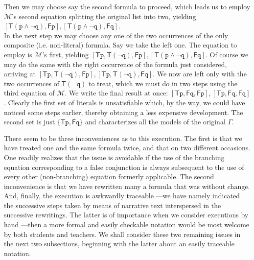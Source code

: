 \documentclass[a4paper,UKenglish]{lipics}
\newcounter{c}
\newcommand{\lett}[1]{\texttt{#1}}
\newcommand{\sg}[1]{\textsf{#1}}
\newcommand{\allmodels}{\ensuremath{\mathcal{M}}}
\begin{document}
\noindent Then we may choose say the second formula to proceed, which leads us to employ \allmodels's second equation splitting the original list into two, yielding
$[\sg{T}(\lett{p}\wedge\neg\lett{q}) , \sg{F}\lett{p}] , [\sg{T}(\lett{p}\wedge\neg\lett{q}) , \sg{F}\lett{q}]$.\\
In the next step we may choose any one of the two occurrences of the only composite (i.e. non-literal) formula. Say  we take the left one. The equation to employ is \allmodels's first, yielding
$[\sg{T}\lett{p} , \sg{T}(\neg\lett{q}) , \sg{F}\lett{p}] , [\sg{T}(\lett{p}\wedge\neg\lett{q}) , \sg{F}\lett{q}]$.
Of course we may do the same with the right occurrence of the formula just considered, arriving at
$[\sg{T}\lett{p} , \sg{T}(\neg\lett{q}) , \sg{F}\lett{p}] , [\sg{T}\lett{p} , \sg{T}(\neg\lett{q}) , \sg{F}\lett{q}]$.
We now are left only with the two occurrences of $\sg{T}(\neg\lett{q})$ to treat, which we must do in two steps using the third equation of \allmodels. We write the final result at once:
$[\sg{T}\lett{p} , \sg{F}\lett{q} , \sg{F}\lett{p}] , [\sg{T}\lett{p} , \sg{F}\lett{q} , \sg{F}\lett{q}]$. 
Clearly the first set of literals is unsatisfiable which, by the way, we could have noticed some steps earlier, thereby obtaining a less expensive development. The second set is just 
$\{\sg{T}\lett{p} , \sg{F}\lett{q}\}$
\noindent and characterizes all the models of the original $\Gamma$.

There seem to be three inconveniences as to this execution. The first is that we have treated one and the same formula twice, and that on two different occasions. One readily realizes that the issue is avoidable if the use of the branching equation corresponding to a false conjunction is always subsequent to the use of every other (non-branching) equation formerly applicable.
The second inconvenience is that we have rewritten many a formula that was without change. And, finally, the execution is awkwardly traceable ---we have namely indicated the successive steps taken by means of narrative text interspersed in the successive rewritings. The latter is of importance when we consider executions by hand ---then a more formal and easily checkable notation would be most welcome by both students and teachers.
We shall consider these two remaining issues in the next two subsections, beginning with the latter about an easily traceable notation.
\end{document}
